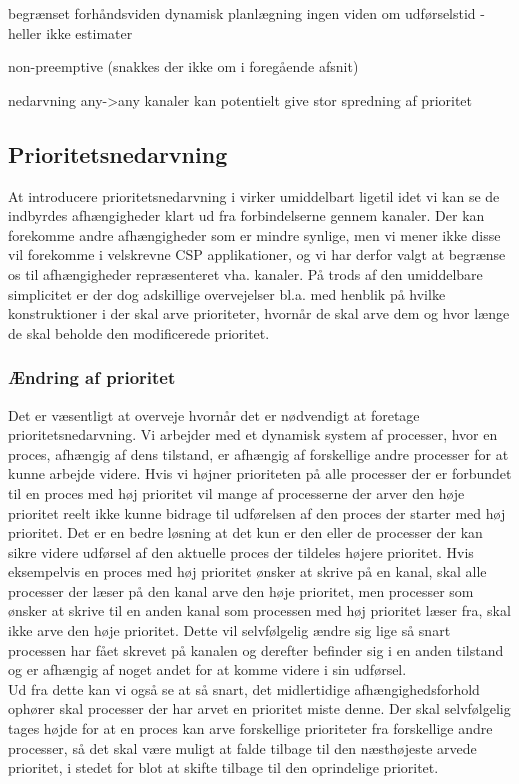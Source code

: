 
begrænset forhåndsviden 
  dynamisk planlægning
  ingen viden om udførselstid - heller ikke estimater  

non-preemptive (snakkes der ikke om i foregående afsnit)

nedarvning
  any->any kanaler kan potentielt give stor spredning af prioritet

\subsection{Prioritetsnedarvning}
At introducere prioritetsnedarvning i \pycsp virker umiddelbart ligetil idet vi kan se de indbyrdes afhængigheder klart ud fra forbindelserne gennem kanaler. Der kan forekomme andre afhængigheder som er mindre synlige, men vi mener ikke disse vil forekomme i velskrevne CSP applikationer, og vi har derfor valgt at begrænse os til afhængigheder repræsenteret vha. kanaler. På trods af den umiddelbare simplicitet er der dog adskillige overvejelser bl.a. med henblik på hvilke konstruktioner i \pycsp der skal arve prioriteter, hvornår de skal arve dem og hvor længe de skal beholde den modificerede prioritet. \\

\subsubsection*{Ændring af prioritet}
Det er væsentligt at overveje hvornår det er nødvendigt at foretage prioritetsnedarvning. Vi arbejder med et dynamisk system af processer, hvor en proces, afhængig af dens tilstand, er afhængig af forskellige andre processer for at kunne arbejde videre. Hvis vi højner prioriteten på alle processer der er forbundet til en proces med høj prioritet vil mange af processerne der arver den høje prioritet reelt ikke kunne bidrage til udførelsen af den proces der starter med høj prioritet. Det er en bedre løsning at det kun er den eller de processer der kan sikre videre udførsel af den aktuelle proces der tildeles højere prioritet. Hvis eksempelvis en proces med høj prioritet ønsker at skrive på en kanal, skal alle processer der læser på den kanal arve den høje prioritet, men processer som ønsker at skrive til en anden kanal som processen med høj prioritet læser fra, skal ikke arve den høje prioritet. Dette vil selvfølgelig ændre sig lige så snart processen har fået skrevet på kanalen og derefter befinder sig i en anden tilstand og er afhængig af noget andet for at komme videre i sin udførsel. \\
Ud fra dette kan vi også se at så snart, det midlertidige afhængighedsforhold ophører skal processer der har arvet en prioritet miste denne. Der skal selvfølgelig tages højde for at en proces kan arve forskellige prioriteter fra forskellige andre processer, så det skal være muligt at falde tilbage til den næsthøjeste arvede prioritet, i stedet for blot at skifte tilbage til den oprindelige prioritet. 

